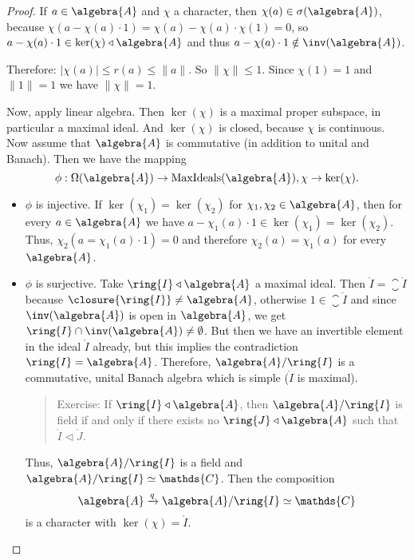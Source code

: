 \documentclass[a4paper]{article}
\begin{document}
\begin{proof}
	If $a \in \algebra{A}$ and $\chi$ a character, then $\chi(a) \in \sigma(\algebra{A})$, because $\chi(a - \chi(a) \cdot 1) = \chi(a) - \chi(a) \cdot \chi(1) = 0$, so $a - \chi(a) \cdot 1 \in \ker(\chi) \triangleleft \algebra{A}$ and thus $a - \chi(a) \cdot 1 \notin \inv(\algebra{A})$.

	Therefore: $|\chi(a)| \leq r(a) \leq \|a\|$. So $\|\chi\| \leq 1$. Since $\chi(1) = 1$ and $\|1\| = 1$ we have $\|\chi\| = 1$.

	Now, apply linear algebra. Then $\ker (\chi)$ is a maximal proper subspace, in particular a maximal ideal.
	And $\ker(\chi)$ is closed, because $\chi$ is continuous.
	Now assume that $\algebra{A}$ is commutative (in addition to unital and Banach).
	Then we have the mapping
	\begin{equation*}
		\phi: \Omega(\algebra{A}) \to \mathrm{MaxIdeals}(\algebra{A}), \chi \to \ker(\chi)\text{.}
	\end{equation*}
	\begin{itemize}
		\item $\phi$ is injective.
		      If $\ker(\chi_1) = \ker(\chi_2)$ for $\chi_1, \chi_2 \in \algebra{A}$, then for every $a \in \algebra{A}$ we have $a - \chi_1(a) \cdot 1 \in \ker(\chi_1) =\ker(\chi_2)$.
		      Thus, $\chi_2(a = \chi_1(a) \cdot 1) = 0$ and therefore $\chi_2(a) = \chi_1(a)$ for every $\algebra{A}$.
		\item $\phi$ is surjective.
		      Take $\ring{I} \triangleleft  \algebra{A}$ a maximal ideal.
		      Then $\ring{I} = \closure{\ring{I}}$ because $\closure{\ring{I}} \neq \algebra{A}$, otherwise $1 \in \closure{\ring{I}}$ and since $\inv(\algebra{A})$ is open in $\algebra{A}$, we get $\ring{I} \cap \inv(\algebra{A}) \neq \emptyset$.
		      But then we have an invertible element in the ideal $\ring{I}$ already, but this implies the contradiction $\ring{I} = \algebra{A}$.
		      Therefore, $\algebra{A} / \ring{I}$ is a commutative, unital Banach algebra which is simple ($\ring{I}$ is maximal).
		      \begin{quote}
			      Exercise: If $\ring{I} \triangleleft \algebra{A}$, then $\algebra{A} / \ring{I}$ is field if and only if there exists no $\ring{J} \triangleleft \algebra{A}$ such that $\ring{I} \triangleleft \ring{J}$.
		      \end{quote}
		      Thus, $\algebra{A} / \ring{I}$ is a field and $\algebra{A} / \ring{I} \simeq \mathds{C}$.
		      Then the composition
		      \begin{equation*}
			      \algebra{A} \xrightarrow{q} \algebra{A} / \ring{I} \simeq \mathds{C}
		      \end{equation*}
		      is a character with $ \ker(\chi) = \ring{I}$.
	\end{itemize}
\end{proof}
\end{document}
